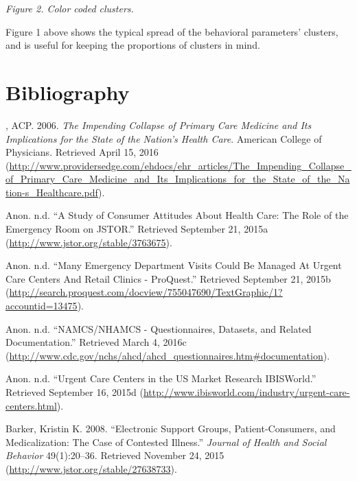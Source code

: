 \documentclass[12pt,twoside]{reedthesis}
\begin{document}
  \emph{Figure 2. Color coded clusters.}
  
  Figure 1 above shows the typical spread of the behavioral parameters'
  clusters, and is useful for keeping the proportions of clusters in mind.
  
  \backmatter
  
  \chapter*{Bibliography}\label{bibliography}
  
  \noindent
  \setlength{\parindent}{-0.20in} \setlength{\leftskip}{0.20in}
  \setlength{\parskip}{8pt}
  
  \hypertarget{refs}{}
  \hypertarget{ref-ACPux5fimpendingux5f2006}{}
  , ACP. 2006. \emph{The Impending Collapse of Primary Care Medicine and
  Its Implications for the State of the Nation's Health Care}. American
  College of Physicians. Retrieved April 15, 2016
  (\url{http://www.providersedge.com/ehdocs/ehr_articles/The_Impending_Collapse_of_Primary_Care_Medicine_and_Its_Implications_for_the_State_of_the_Nation-s_Healthcare.pdf}).
  
  \hypertarget{ref-CONSUMERux5fHEALTH}{}
  Anon. n.d. ``A Study of Consumer Attitudes About Health Care: The Role
  of the Emergency Room on JSTOR.'' Retrieved September 21, 2015a
  (\url{http://www.jstor.org/stable/3763675}).
  
  \hypertarget{ref-manyux5fER}{}
  Anon. n.d. ``Many Emergency Department Visits Could Be Managed At Urgent
  Care Centers And Retail Clinics - ProQuest.'' Retrieved September 21,
  2015b
  (\url{http://search.proquest.com/docview/755047690/TextGraphic/1?accountid=13475}).
  
  \hypertarget{ref-namcs}{}
  Anon. n.d. ``NAMCS/NHAMCS - Questionnaires, Datasets, and Related
  Documentation.'' Retrieved March 4, 2016c
  (\url{http://www.cdc.gov/nchs/ahcd/ahcd_questionnaires.htm\#documentation}).
  
  \hypertarget{ref-UCux5fMarket}{}
  Anon. n.d. ``Urgent Care Centers in the US Market Research IBISWorld.''
  Retrieved September 16, 2015d
  (\url{http://www.ibisworld.com/industry/urgent-care-centers.html}).
  
  \hypertarget{ref-barkerux5felectronicux5f2008}{}
  Barker, Kristin K. 2008. ``Electronic Support Groups, Patient-Consumers,
  and Medicalization: The Case of Contested Illness.'' \emph{Journal of
  Health and Social Behavior} 49(1):20--36. Retrieved November 24, 2015
  (\url{http://www.jstor.org/stable/27638733}).
  
\end{document}
